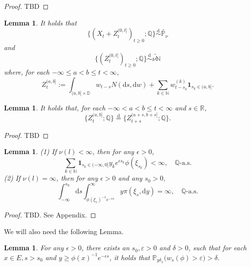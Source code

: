 \documentclass[12pt,a4paper]{amsart}
\numberwithin{equation}{section}
\theoremstyle{plain}
\newtheorem{lem}[thm]{Lemma}
\theoremstyle{definition}
\theoremstyle{remark}
\begin{document}
\begin{proof}
	TBD
\end{proof}
\begin{lem}\label{thm:E.2}
	It holds that 
\[
	\{(X_t + Z_t^{(0,t]})_{t\geq 0}; \mathbb Q\} \overset{\text{d}}\sim \widetilde{\mathbb P_\nu}
\]
	and
\[
	\{(Z_t^{(0,t]})_{t\geq 0}; \mathbb Q\} \overset{\text{d}}\sim \widetilde{\nu\mathbb N}
\]
	where, for each $-\infty \leq a < b \leq t<\infty$,
\begin{equation} \label{eq:E.4}
	Z_t^{(a,b]}:= \int_{(a,b]\times \mathbb D} w_{t-s} N(\mathrm ds,\mathrm dw) + \sum_{k\in \mathbb N} w^{(k)}_{t-s_k} \mathbf 1_{s_k \in (a,b]}.
\end{equation}
\end{lem}

\begin{lem}\label{thm:E.3}
	It holds that, for each $-\infty < a < b \leq t<\infty$ and $s\in \mathbb R$,
	\[
	\{Z_t^{(a,b]}; \mathbb Q\} \overset{\text{d}}= \{Z_{t+s}^{(a+s,b+s]}; \mathbb Q\}.
	\]
\end{lem}
\begin{proof}
	TBD
\end{proof}
\begin{lem}\label{thm:E.4}	
	(1) If $\nu(l)<\infty$,
	then for any $\epsilon>0$,
	\[
	\sum_{k\in \mathbb N} \mathbf 1_{s_k \in (-\infty,0]} y_k e^{\epsilon s_k} \phi(\xi_{s_k}) < \infty, \quad \mathbb Q\text{-a.s.}
	\]
	(2) If  $ \nu(l)=\infty$,
	then for any $\epsilon>0$ and any $s_0>0$,
	\begin{equation}
	\int^{s_0}_{-\infty} {\mathrm d}s
	\int_{\phi(\xi_s)^{-1}e^{-\epsilon s}}^\infty y\pi(\xi_s,{\mathrm d}y)
	=\infty, 
	\quad {\mathbb Q}\text{-a.s.}
	\end{equation}
\end{lem}
\begin{proof}
	TBD. See Appendix.
\end{proof}
	We will also need the following Lemma.
\begin{lem} \label{thm:E.5}
	For any $\epsilon > 0$, there exists an $s_0, \varepsilon>0$ and $\delta > 0$,  such that for each $x\in E, s>s_0$ and $y\geq \phi(x)^{-1}e^{-\epsilon s}$, it holds that
$
	\mathbb P_{y \delta_{x}}\big(w_{s}(\phi)>\varepsilon\big) > \delta.
$
\end{lem}
\end{document}
